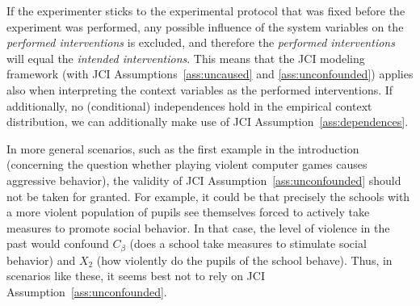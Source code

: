 \documentclass[twoside,11pt]{article}
\begin{document}
If the experimenter
sticks to the experimental protocol that was fixed before the experiment was performed, any possible
influence of the system variables on the \emph{performed interventions} is excluded, and therefore the
\emph{performed interventions} will equal the \emph{intended interventions}. This means that 
the JCI modeling framework (with JCI Assumptions~\ref{ass:uncaused} and \ref{ass:unconfounded}) applies 
also when interpreting the context variables as the performed interventions.
If additionally, no (conditional) independences hold in the empirical context distribution,
we can additionally make use of JCI Assumption~\ref{ass:dependences}. 

In more general scenarios, such as the first example in the introduction
(concerning the question whether playing violent computer games causes
aggressive behavior), the validity of JCI Assumption~\ref{ass:unconfounded}
should not be taken for granted. For example, it could be that precisely the 
schools with a more violent population of pupils see themselves forced to
actively take measures to promote social behavior. In that case, the level
of violence in the past would confound $C_\beta$ (does a school take measures
to stimulate social behavior) and $X_2$ (how violently do the pupils of the
school behave). 
Thus, in scenarios like these, it seems
best not to rely on JCI Assumption~\ref{ass:unconfounded}.
\end{document}
